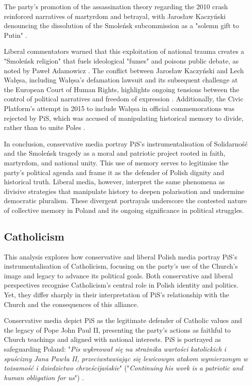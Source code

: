 The party's promotion of the assassination theory regarding the 2010 crash reinforced narratives of martyrdom and betrayal, with Jarosław Kaczyński denouncing the dissolution of the Smoleńsk subcommission as a "solemn gift to Putin" \citep{czuchnowski_koniec_2023}.

Liberal commentators warned that this exploitation of national trauma creates a "Smoleńsk religion" that fuels ideological "fumes" and poisons public debate, as noted by Paweł Adamowicz \citep{sandecki_adamowicz_2023}. The conflict between Jarosław Kaczyński and Lech Wałęsa, including Wałęsa's defamation lawsuit and its subsequent challenge at the European Court of Human Rights, highlights ongoing tensions between the control of political narratives and freedom of expression \citep{woznicki_kaczynski_2023}. Additionally, the Civic Platform's attempt in 2015 to include Wałęsa in official commemorations was rejected by PiS, which was accused of manipulating historical memory to divide, rather than to unite Poles \citep{gazeta_wyborcza_pis_2015}.

In conclusion, conservative media portray PiS's instrumentalisation of Solidarność and the Smoleńsk tragedy as a moral and patriotic project rooted in faith, martyrdom, and national unity. This use of memory serves to legitimise the party's political agenda and frame it as the defender of Polish dignity and historical truth. Liberal media, however, interpret the same phenomena as divisive strategies that manipulate history to deepen polarisation and undermine democratic pluralism. These divergent portrayals underscore the contested nature of collective memory in Poland and its ongoing significance in political struggles.

\subsection{Catholicism}

This analysis explores how conservative and liberal Polish media portray PiS's instrumentalisation of Catholicism, focusing on the party's use of the Church's image and legacy to advance its political goals. Both conservative and liberal perspectives recognise Catholicism's central role in Polish identity and politics. Yet, they differ sharply in their interpretation of PiS's relationship with the Church and the consequences of this alliance.

Conservative media depict PiS as the legitimate defender of Catholic values and the legacy of Pope John Paul II, presenting the party’s actions as faithful to Church teachings and aligned with national interests. PiS is portrayed as safeguarding Poland: "\textit{Pis wykreował się na strażnika wartości katolickich i spuścizny Jana Pawła II, przeciwstawiając się lewicowym atakom wymierzonym w tożsamość i dziedzictwo chrześcijańskie}" ("\textit{Continuing his work is a patriotic and human obligation for us}") \citep{szuldrzynski_michal_2023}.

